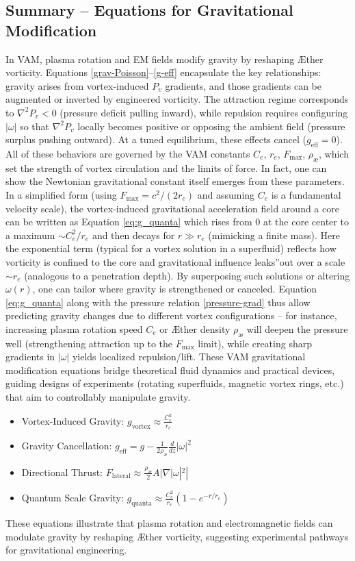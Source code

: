 \subsection*{Summary – Equations for Gravitational Modification}
In VAM, plasma rotation and EM fields modify gravity by reshaping Æther vorticity. Equations \eqref{grav-Poisson}–\eqref{g-eff} encapsulate the key relationships: gravity arises from vortex-induced $P_v$ gradients, and those gradients can be augmented or inverted by engineered vorticity. The attraction regime corresponds to $\nabla^2 P_v < 0$ (pressure deficit pulling inward), while repulsion requires configuring $|\omega|$ so that $\nabla^2 P_v$ locally becomes positive or opposing the ambient field (pressure surplus pushing outward). At a tuned equilibrium, these effects cancel ($g_{\text{eff}}=0$). All of these behaviors are governed by the VAM constants $C_e$, $r_e$, $F_{\max}$, $\rho_\text{\ae}$, which set the strength of vortex circulation and the limits of force. In fact, one can show the Newtonian gravitational constant itself emerges from these parameters. In a simplified form (using $F_{\max}=c^2/(2r_e)$ and assuming $C_e$ is a fundamental velocity scale), the vortex-induced gravitational acceleration field around a core can be written as Equation \eqref{eq:g_quanta} which rises from 0 at the core center to a maximum $\sim C_e^2/r_e$ and then decays for $r \gg r_e$ (mimicking a finite mass). Here the exponential term (typical for a vortex solution in a superfluid) reflects how vorticity is confined to the core and gravitational influence \grqq leaks\textquotedblright out over a scale $\sim r_e$ (analogous to a penetration depth). By superposing such solutions or altering $\omega(r)$, one can tailor where gravity is strengthened or canceled. Equation \eqref{eq:g_quanta} along with the pressure relation \eqref{pressure-grad} thus allow predicting gravity changes due to different vortex configurations – for instance, increasing plasma rotation speed $C_e$ or Æther density $\rho_\text{\ae}$ will deepen the pressure well (strengthening attraction up to the $F_{\max}$ limit), while creating sharp gradients in $|\omega|$ yields localized repulsion/lift. These VAM gravitational modification equations bridge theoretical fluid dynamics and practical devices, guiding designs of experiments (rotating superfluids, magnetic vortex rings, etc.) that aim to controllably manipulate gravity.


\begin{itemize}
    \item Vortex-Induced Gravity: $g_\text{vortex} \approx \frac{C_e^2}{r_e}$
    \item Gravity Cancellation: $g_\text{eff} = g - \frac{1}{2 \rho_\text{\ae}} \frac{d}{dz} |\omega|^2$
    \item Directional Thrust: $F_\text{lateral} \approx \frac{\rho_\text{\ae}}{2} A |\nabla |\omega|^2|$
    \item Quantum Scale Gravity: $g_\text{quanta} \approx \frac{C_e^2}{r_e} (1 - e^{-r/r_e})$
\end{itemize}

These equations illustrate that plasma rotation and electromagnetic fields can modulate gravity by reshaping Æther vorticity, suggesting experimental pathways for gravitational engineering.